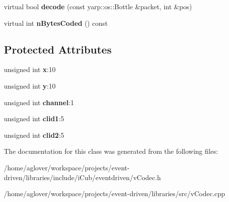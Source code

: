 \begin{DoxyCompactItemize}
\item 
virtual bool {\bfseries decode} (const yarp\+::os\+::\+Bottle \&packet, int \&pos)\hypertarget{classev_1_1CollisionEvent_aacd61e2522dc199f9797673d5dae408c}{}\label{classev_1_1CollisionEvent_aacd61e2522dc199f9797673d5dae408c}

\item 
virtual int {\bfseries n\+Bytes\+Coded} () const \hypertarget{classev_1_1CollisionEvent_ac2fbae11a37b170bedb0d983f669dd17}{}\label{classev_1_1CollisionEvent_ac2fbae11a37b170bedb0d983f669dd17}

\end{DoxyCompactItemize}
\subsection*{Protected Attributes}
\begin{DoxyCompactItemize}
\item 
unsigned int {\bfseries x}\+:10\hypertarget{classev_1_1CollisionEvent_ab8dfa32e6701e2abcf6601d3a4618547}{}\label{classev_1_1CollisionEvent_ab8dfa32e6701e2abcf6601d3a4618547}

\item 
unsigned int {\bfseries y}\+:10\hypertarget{classev_1_1CollisionEvent_a4d405dc0427ffe8cef534ed9ea1b5356}{}\label{classev_1_1CollisionEvent_a4d405dc0427ffe8cef534ed9ea1b5356}

\item 
unsigned int {\bfseries channel}\+:1\hypertarget{classev_1_1CollisionEvent_a5a79d6b7b51b3d8886cc0631b3ec9bfb}{}\label{classev_1_1CollisionEvent_a5a79d6b7b51b3d8886cc0631b3ec9bfb}

\item 
unsigned int {\bfseries clid1}\+:5\hypertarget{classev_1_1CollisionEvent_a6b0aa9defea3a547c69e78d0258c98dd}{}\label{classev_1_1CollisionEvent_a6b0aa9defea3a547c69e78d0258c98dd}

\item 
unsigned int {\bfseries clid2}\+:5\hypertarget{classev_1_1CollisionEvent_ae64eb6804bac779102337995e23ead68}{}\label{classev_1_1CollisionEvent_ae64eb6804bac779102337995e23ead68}

\end{DoxyCompactItemize}


The documentation for this class was generated from the following files\+:\begin{DoxyCompactItemize}
\item 
/home/aglover/workspace/projects/event-\/driven/libraries/include/i\+Cub/eventdriven/v\+Codec.\+h\item 
/home/aglover/workspace/projects/event-\/driven/libraries/src/v\+Codec.\+cpp\end{DoxyCompactItemize}
